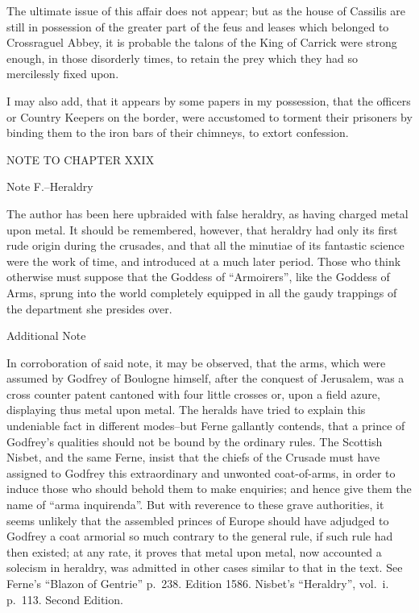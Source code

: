 The ultimate issue of this affair does not appear; but as the house of
Cassilis are still in possession of the greater part of the feus and
leases which belonged to Crossraguel Abbey, it is probable the talons of
the King of Carrick were strong enough, in those disorderly times, to
retain the prey which they had so mercilessly fixed upon.

I may also add, that it appears by some papers in my possession, that
the officers or Country Keepers on the border, were accustomed to
torment their prisoners by binding them to the iron bars of their
chimneys, to extort confession.

NOTE TO CHAPTER XXIX

Note F.--Heraldry

The author has been here upbraided with false heraldry, as having
charged metal upon metal. It should be remembered, however, that
heraldry had only its first rude origin during the crusades, and that
all the minutiae of its fantastic science were the work of time, and
introduced at a much later period. Those who think otherwise must
suppose that the Goddess of ``Armoirers'', like the Goddess of Arms,
sprung into the world completely equipped in all the gaudy trappings of
the department she presides over.

Additional Note

In corroboration of said note, it may be observed, that the arms, which
were assumed by Godfrey of Boulogne himself, after the conquest of
Jerusalem, was a cross counter patent cantoned with four little crosses
or, upon a field azure, displaying thus metal upon metal. The heralds
have tried to explain this undeniable fact in different modes--but Ferne
gallantly contends, that a prince of Godfrey's qualities should not be
bound by the ordinary rules. The Scottish Nisbet, and the same Ferne,
insist that the chiefs of the Crusade must have assigned to Godfrey this
extraordinary and unwonted coat-of-arms, in order to induce those who
should behold them to make enquiries; and hence give them the name of
``arma inquirenda''. But with reverence to these grave authorities, it
seems unlikely that the assembled princes of Europe should have adjudged
to Godfrey a coat armorial so much contrary to the general rule, if such
rule had then existed; at any rate, it proves that metal upon metal, now
accounted a solecism in heraldry, was admitted in other cases similar to
that in the text. See Ferne's ``Blazon of Gentrie'' p.~238. Edition
1586. Nisbet's ``Heraldry'', vol.~i. p.~113. Second Edition.

